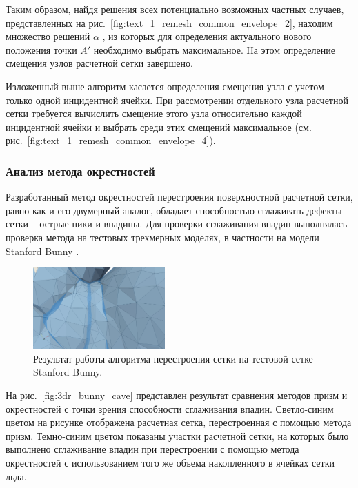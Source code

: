 Таким образом, найдя решения всех потенциально возможных частных случаев, представленных на рис.~\ref{fig:text_1_remesh_common_envelope_2}, находим множество решений $\alpha$ , из которых для определения актуального нового положения точки $A'$ необходимо выбрать максимальное.
На этом определение смещения узлов расчетной сетки завершено.

Изложенный выше алгоритм касается определения смещения узла с учетом только одной инцидентной ячейки.
При рассмотрении отдельного узла расчетной сетки требуется вычислить смещение этого узла относительно каждой инцидентной ячейки и выбрать среди этих смещений максимальное (см. рис.~\ref{fig:text_1_remesh_common_envelope_4}).

\subsubsection{Анализ метода окрестностей}

Разработанный метод окрестностей перестроения поверхностной расчетной сетки, равно как и его двумерный аналог, обладает способностью сглаживать дефекты сетки -- острые пики и впадины.
Для проверки сглаживания впадин выполнялась проверка метода на тестовых трехмерных моделях, в частности на модели Stanford Bunny \cite{StanfordModels}.

\begin{figure}[ht]
\centering
\includegraphics[width=0.45\textwidth]{fig/3dr_bunny_cave.png}
\singlespacing
{}\caption{Результат работы алгоритма перестроения сетки на тестовой сетке Stanford Bunny.}
\label{fig:text_1_remesh3_common_envelope_bunny}
\end{figure}

На рис.~\ref{fig:3dr_bunny_cave} представлен результат сравнения методов призм и окрестностей с точки зрения способности сглаживания впадин.
Светло-синим цветом на рисунке отображена расчетная сетка, перестроенная с помощью метода призм.
Темно-синим цветом показаны участки расчетной сетки, на которых было выполнено сглаживание впадин при перестроении с помощью метода окрестностей с использованием того же объема накопленного в ячейках сетки льда.

